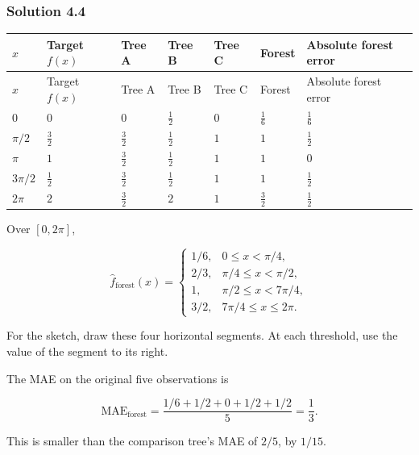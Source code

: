 \documentclass[10pt]{article}
\begin{document}
\subsubsection*{Solution 4.4}
\begingroup
\small
\setlength{\tabcolsep}{4pt}
\begin{longtable}{l|l|l|l|l|l|l}
$x$ & Target $f(x)$ & Tree A & Tree B & Tree C & Forest & Absolute forest error \\
\hline
\endfirsthead
$x$ & Target $f(x)$ & Tree A & Tree B & Tree C & Forest & Absolute forest error \\
\hline
\endhead
$0$ & $0$ & $0$ & $\frac{1}{2}$ & $0$ & $\frac{1}{6}$ & $\frac{1}{6}$ \\[1.5pt]
$\pi/2$ & $\frac{3}{2}$ & $\frac{3}{2}$ & $\frac{1}{2}$ & $1$ & $1$ & $\frac{1}{2}$ \\[1.5pt]
$\pi$ & $1$ & $\frac{3}{2}$ & $\frac{1}{2}$ & $1$ & $1$ & $0$ \\[1.5pt]
$3\pi/2$ & $\frac{1}{2}$ & $\frac{3}{2}$ & $\frac{1}{2}$ & $1$ & $1$ & $\frac{1}{2}$ \\[1.5pt]
$2\pi$ & $2$ & $\frac{3}{2}$ & $2$ & $1$ & $\frac{3}{2}$ & $\frac{1}{2}$ \\[1.5pt]
\end{longtable}
\endgroup
Over $[0,2\pi]$,

\[
\hat f_{\mathrm{forest}}(x)=\begin{cases}
1/6,&0\leq x<\pi/4,\\
2/3,&\pi/4\leq x<\pi/2,\\
1,&\pi/2\leq x<7\pi/4,\\
3/2,&7\pi/4\leq x\leq2\pi.
\end{cases}
\]

For the sketch, draw these four horizontal segments. At each threshold,
use the value of the segment to its right.

The MAE on the original five observations is

\[
\mathrm{MAE}_{\mathrm{forest}}=\frac{1/6+1/2+0+1/2+1/2}{5}=\frac13.
\]

This is smaller than the comparison tree's MAE of $2/5$, by $1/15$.
\end{document}
